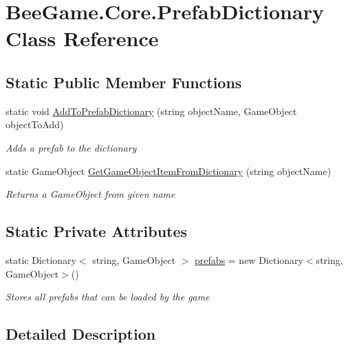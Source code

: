 \hypertarget{class_bee_game_1_1_core_1_1_prefab_dictionary}{}\section{Bee\+Game.\+Core.\+Prefab\+Dictionary Class Reference}
\label{class_bee_game_1_1_core_1_1_prefab_dictionary}
\subsection*{Static Public Member Functions}
\begin{DoxyCompactItemize}
\item 
static void \hyperlink{class_bee_game_1_1_core_1_1_prefab_dictionary_a71a5cfc3c0e9ec6d630b2aac96615108}{Add\+To\+Prefab\+Dictionary} (string object\+Name, Game\+Object object\+To\+Add)
\begin{DoxyCompactList}\small\item\em Adds a prefab to the dictionary \end{DoxyCompactList}\item 
static Game\+Object \hyperlink{class_bee_game_1_1_core_1_1_prefab_dictionary_a5435ea289663e612fc964438691e32d0}{Get\+Game\+Object\+Item\+From\+Dictionary} (string object\+Name)
\begin{DoxyCompactList}\small\item\em Returns a Game\+Object from given name \end{DoxyCompactList}\end{DoxyCompactItemize}
\subsection*{Static Private Attributes}
\begin{DoxyCompactItemize}
\item 
static Dictionary$<$ string, Game\+Object $>$ \hyperlink{class_bee_game_1_1_core_1_1_prefab_dictionary_a209d61a11be378eab228e65b439e485f}{prefabs} = new Dictionary$<$string, Game\+Object$>$()
\begin{DoxyCompactList}\small\item\em Stores all prefabs that can be loaded by the game \end{DoxyCompactList}\end{DoxyCompactItemize}


\subsection{Detailed Description}


